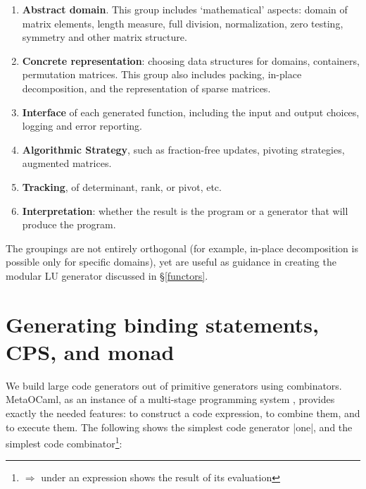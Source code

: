 \documentclass{elsart}
\newcommand{\oleg}[1]{{\it [Oleg says: #1]}}
\newcommand{\jacques}[1]{{\it [Jacques says: #1]}}
\begin{document}
\begin{enumerate}
    \item \textbf{Abstract domain}.  This group includes
      `mathematical' aspects: domain of matrix elements, length
      measure, full division, normalization, zero testing,
      symmetry and other matrix structure.
    \item \textbf{Concrete representation}: choosing data
      structures for domains, containers, permutation
      matrices. This group also includes packing, in-place
      decomposition, and the
      representation of sparse matrices.
    \item \textbf{Interface} of each generated function, including
      the input and output choices, logging and error reporting.
    \item \textbf{Algorithmic Strategy}, such as fraction-free
      updates, pivoting strategies, augmented matrices.
    \item \textbf{Tracking}, of determinant, rank, or pivot, etc.
    \item \textbf{Interpretation}: whether the result is the program or a
      generator that will produce the program.
\end{enumerate}


The groupings are not entirely orthogonal (for example, in-place
decomposition is possible only for specific domains), yet are useful
as guidance in creating the modular LU generator discussed in 
\S\ref{functors}.

\section{Generating binding statements, CPS, and monad}\label{CPS}

We build large code generators out of primitive generators using 
combinators. MetaOCaml, as an instance of a multi-stage
programming system \cite{TahaThesis}, provides exactly the needed
features: to construct a code expression, to combine them, and to
execute them. The following shows the simplest code generator |one|,
and the simplest code combinator\footnote{%
$\Longrightarrow$ under an expression shows the result of its evaluation}:
\end{document}
